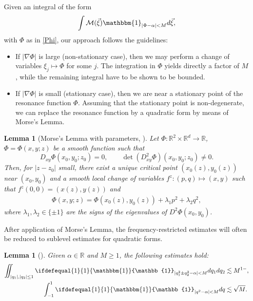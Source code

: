 \documentclass[a4paper,
11pt,  reqno]{amsart}
\newcommand{\5}{\textup{V}}
\newcommand{\m}[1]{
	\ifdefequal{#1}{1}
	{\mathbbm{#1}}
	{\mathbb{#1}}
}
\newtheorem{lemma}[theorem]{Lemma}
\theoremstyle{remark}
\newcommand{\R}{\mathbb{R}}
\newcommand{\ld}{\lambda}
\numberwithin{equation}{section}
\numberwithin{theorem}{section}
\begin{document}
Given an integral of the form
$$
\int \mathcal{M}(\vec\xi)\mathbbm{1}_{|\Phi-\alpha|<M}d\vec{\xi},
$$
with $\Phi$ as in \eqref{Phi},
our approach follows the guidelines:
\begin{itemize}
\item If $|\nabla \Phi|$ is large (non-stationary case), then we may perform a change of variables $\xi_j\mapsto \Phi$ for some $j$. The integration in $\Phi$ yields directly a factor of $M$, while the remaining integral have to be shown to be bounded.
\item If $|\nabla \Phi|$ is small (stationary case), then we are near a stationary point of the resonance function $\Phi$. Assuming that the stationary point is non-degenerate, we can replace the resonance function by a quadratic form by means of Morse's Lemma.

\end{itemize}


		\begin{lemma}[Morse's Lemma with parameters, {\cite[Lemma C.6.1]{Hormander}}]
			\label{LEM:morse}
		Let $\Phi: \R^2\times \R^d \to \R$, $\Phi=\Phi(x,y;z)$ be a smooth function such that
        $$D_{xy} \Phi(x_0,y_0;z_0) = 0,\qquad\det(D^2_{xy} \Phi)(x_0,y_0;z_0) \ne 0.$$
Then, for $|z-z_0|$ small, there exist a unique critical point $(x_0(z),y_0(z))$ near $(x_0,y_0)$ and  a smooth local change of variables $f^z: (p,q) \mapsto (x,y) $ such that $f^z(0,0) = (x(z),y(z))$ and
\begin{align}
\Phi(x,y;z) = \Phi(x_0(z), y_0(z)) + \ld_1 p^2 + \ld_2 q^2,
\end{align}
where $\ld_1,\ld_2 \in \{\pm1\}$ are the signs of the eigenvalues of $D^2\Phi(x_0,y_0)$.
		\end{lemma}




       After application of Morse's Lemma, the frequency-restricted estimates will often be reduced to sublevel estimates for quadratic forms.


		\begin{lemma}[{\cite[Lemma 5]{COS}}]
        \label{lem:quadraticas}
			Given $\alpha\in \R$ and $M\ge 1$, the following estimates hold:
			\begin{align}
            \label{eq:posdef}
				\iint_{|q_1|, |q_2|\le 1} \m 1_{|q_1^2\pm q_2^2-\alpha|<M}dq_1dq_2 &\lesssim M^{1-}, \\
                \label{eq:quadratica}
				\int_{-1}^{1} \m 1_{|q^2  -\alpha | < M} dq
                &\lesssim \sqrt M
                .
			\end{align}

		\end{lemma}
\end{document}
